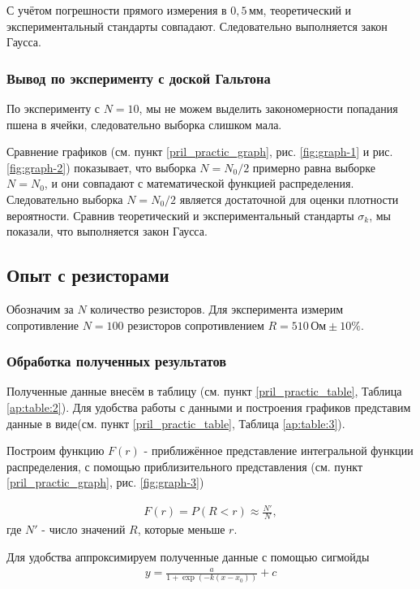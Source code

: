 С учётом погрешности прямого измерения в $0,5 \, \text{мм}$, теоретический и экспериментальный стандарты совпадают. Следовательно выполняется закон Гаусса.

\subsubsection{Вывод по эксперименту с доской Гальтона}

По эксперименту с $N = 10$, мы не можем выделить закономерности попадания пшена в ячейки, следовательно выборка слишком мала. 

Сравнение графиков (см. пункт \ref{pril_practic_graph}, рис. \ref{fig:graph-1} и рис. \ref{fig:graph-2}) показывает, что выборка $N = N_0/2$ примерно равна выборке $N = N_0$, и они совпадают с математической функцией распределения. Следовательно выборка $N = N_0/2$ является достаточной для оценки плотности вероятности. Сравнив теоретический и экспериментальный стандарты $\sigma_k$, мы показали, что выполняется закон Гаусса.

\subsection{Опыт с резисторами}
 
Обозначим за $N$ количество резисторов. Для эксперимента измерим сопротивление $N = 100$ резисторов сопротивлением $R = 510\,\text{Ом}\pm10\%$. 

\subsubsection{Обработка полученных результатов}
Полученные данные внесём в таблицу (см. пункт \ref{pril_practic_table}, Таблица \ref{ap:table:2}). Для удобства работы с данными и построения графиков представим данные в виде(см. пункт \ref{pril_practic_table}, Таблица \ref{ap:table:3}).

Построим функцию $F(r)$ - приближённое представление интегральной функции распределения, с помощью приблизительного представления (см. пункт \ref{pril_practic_graph}, рис. \ref{fig:graph-3})

\begin{align}
	F(r) = P(R < r) \approx \frac{N'}{N},
\end{align} 
где $N'$ - число значений $R$, которые меньше $r$.

Для удобства аппроксимируем полученные данные с помощью сигмойды
\begin{align*}
	y = \frac{a}{1 + \exp(-k (x - x_0))} + c
\end{align*}

